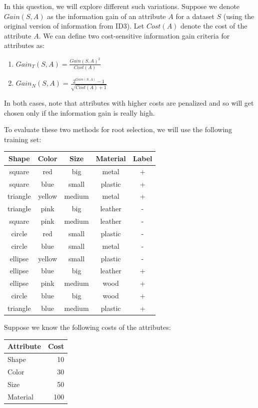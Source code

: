 \documentclass[12pt, fullpage,letterpaper]{article}
\begin{document}
In this question, we will explore different such variations. Suppose
we denote $Gain(S, A)$ as the information gain of an attribute $A$
for a dataset $S$ (using the original version of information from
ID3). Let $Cost(A)$ denote the cost of the attribute $A$. We can
define two cost-sensitive information gain criteria for attributes
as:

\begin{enumerate}
\item $Gain_T(S, A) = \frac{Gain(S, A)^2}{Cost(A)}$

\item  $Gain_N(S, A) = \frac{2^{Gain(S, A)} - 1}{\sqrt{Cost(A) + 1}}$
\end{enumerate}

In both cases, note that attributes with higher costs are penalized
and so will get chosen only if the information gain is really high.


To evaluate these two methods for root selection, we will use the
following training set:
\begin{center}
  \begin{tabular}{cccc|c}
    \hline
    Shape    & Color  & Size   & Material & Label \\ \hline
    square   & red    & big    & metal    & +     \\
    square   & blue   & small  & plastic  & +     \\
    triangle & yellow & medium & metal    & +     \\
    triangle & pink   & big    & leather  & -     \\
    square   & pink   & medium & leather  & -     \\
    circle   & red    & small  & plastic  & -     \\
    circle   & blue   & small  & metal    & -     \\
    ellipse  & yellow & small  & plastic  & -     \\
    ellipse  & blue   & big    & leather  & +     \\
    ellipse  & pink   & medium & wood     & +     \\
    circle   & blue   & big    & wood     & +     \\
    triangle & blue   & medium & plastic  & +     \\  \hline
  \end{tabular}
\end{center}

Suppose we know the following costs of the attributes:
\begin{center}
  \begin{tabular}{lr}
    Attribute & Cost \\\hline
    Shape     & 10   \\
    Color     & 30   \\
    Size      & 50   \\
    Material  & 100  \\\hline
  \end{tabular}
\end{center}
\end{document}
